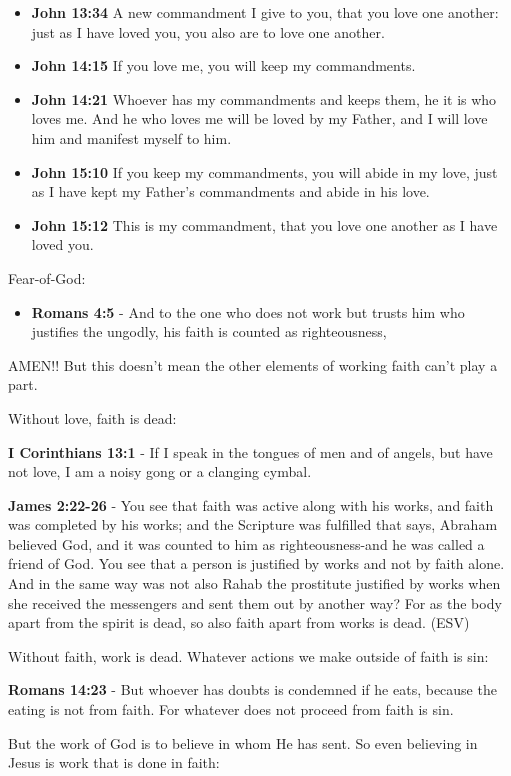 \documentclass[11pt]{article}
\begin{document}
\begin{itemize}
\item \textbf{John 13:34} A new commandment I give to you, that you love one another: just as I have loved you, you also are to love one another.
\item \textbf{John 14:15} If you love me, you will keep my commandments.
\item \textbf{John 14:21} Whoever has my commandments and keeps them, he it is who loves me. And he who loves me will be loved by my Father, and I will love him and manifest myself to him.
\item \textbf{John 15:10} If you keep my commandments, you will abide in my love, just as I have kept my Father's commandments and abide in his love.
\item \textbf{John 15:12} This is my commandment, that you love one another as I have loved you.
\end{itemize}

Fear-of-God:
\begin{itemize}
\item \textbf{Romans 4:5} - And to the one who does not work but trusts him who justifies the ungodly, his faith is counted as righteousness,
\end{itemize}

AMEN!! But this doesn't mean the other elements of working faith can't play a part.

Without love, faith is dead:

\textbf{I Corinthians 13:1} - If I speak in the tongues of men and of angels, but have not love, I am a noisy gong or a clanging cymbal.

\textbf{James 2:22-26} - You see that faith was active along with his works, and faith was completed by his works; and the Scripture was fulfilled that says, Abraham believed God, and it was counted to him as righteousness-and he was called a friend of God. You see that a person is justified by works and not by faith alone. And in the same way was not also Rahab the prostitute justified by works when she received the messengers and sent them out by another way? For as the body apart from the spirit is dead, so also faith apart from works is dead. (ESV)

Without faith, work is dead. Whatever actions we make outside of faith is sin:

\textbf{Romans 14:23} - But whoever has doubts is condemned if he eats, because the eating is not from faith. For whatever does not proceed from faith is sin.

But the work of God is to believe in whom He has sent. So even believing in Jesus is work that is done in faith:
\end{document}
